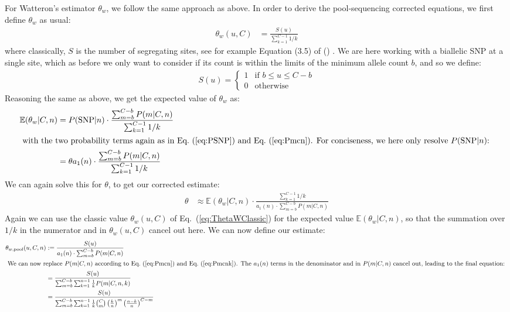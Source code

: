\documentclass[a4paper,9pt,DIV=14]{scrartcl}
\newcommand\eqnref[1]{Eq.~(\ref{#1})}
\newcommand\citeay[1]{\citeauthor{#1} (\citeyear{#1}) \cite{#1}}
\begin{document}
For Watteron's estimator $\theta_w$, we follow the same approach as above.
In order to derive the pool-sequencing corrected equations, we first define $\theta_w$ as usual:
% 
\begin{align}
    \label{eq:ThetaWClassic}
    \theta_w(u, C) &= \frac{S(u)}{ \sum_{k=1}^{C-1} 1/k }
\end{align}
% 
where classically, $S$ is the number of segregating sites, see for example Equation (3.5) of \citeay{Hahn2018}.
We are here working with a biallelic SNP at a single site, 
which as before we only want to consider if its count is within the limits of the minimum allele count $b$, 
and so we define:
% 
\begin{align}
    S(u) = 
    \begin{cases}
        1 & \text{if } b \le u \le C-b
        \\
        0 & \text{otherwise}
    \end{cases}
\end{align}
% 
Reasoning the same as above, we get the expected value of $\theta_w$ as:
% 
\begin{align}
    \nonumber
    \mathbb{E}(\theta_w|C,n) 
    &= P(\mbox{SNP} | n) \cdot \frac{
        \sum_{m=b}^{C-b} P(m|C,n)
    }{
        \sum_{k=1}^{C-1} 1/k
    }
    \\
    \intertext{
        with the two probability terms again as in \eqnref{eq:PSNP} and \eqnref{eq:Pmcn}.
        For conciseness, we here only resolve $P(\mbox{SNP} | n)$:
    }
    \label{eq:ExpecationThetaW}
    &= \theta  a_1(n) \cdot \frac{
        \sum_{m=b}^{C-b} P(m|C,n)
    }{
        \sum_{k=1}^{C-1} 1/k
    }
\end{align}
% 
We can again solve this for $\theta$, to get our corrected estimate:
%
\begin{align}
    \label{eq:CorrectedThetaEstimate}
    \theta &\approx 
    \mathbb{E}(\theta_w|C,n) \cdot 
    \frac{
        \sum_{k=1}^{C-1} 1/k
    }{
        a_1(n) \cdot \sum_{m=b}^{C-b} P(m|C,n)
    }
\end{align}
%
Again we can use the classic value $\theta_w(u, C)$ of \eqnref{eq:ThetaWClassic} for the expected value $\mathbb{E}(\theta_w|C,n)$, 
so that the summation over $1/k$ in the numerator and in $\theta_w(u, C)$ cancel out here.
We can now define our estimate:
%
\begin{align}
    \nonumber
    \theta_{w,\text{pool}}(u,C,n) 
    &:= \frac{
        S(u)
    }{
        a_1(n) \cdot \sum_{m=b}^{C-b} P(m|C,n)
    } \\
    \intertext{
        We can now replace $P(m|C,n)$ according to \eqnref{eq:Pmcn} and \eqnref{eq:Pmcnk}. The $a_1(n)$ terms in the denominator and in $P(m|C,n)$ cancel out, leading to the final equation:
    }
    \nonumber
    &= \frac{S(u)}{ \sum_{m=b}^{C-b} \sum_{k=1}^{n-1} \frac{1}{k} P(m|C,n,k) } \\
    \label{eq:ThetaWPool}
    &= \frac{S(u)}{ \sum_{m=b}^{C-b} \sum_{k=1}^{n-1} \frac{1}{k} {C \choose m} \left(\frac{k}{n}\right)^m \left(\frac{n-k}{n}\right)^{C-m} }
\end{align}
\end{document}
